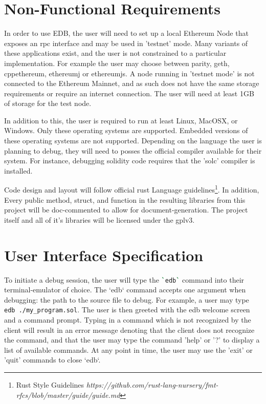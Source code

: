 \documentclass{report}
\begin{document}
\section{Non-Functional Requirements}
In order to use EDB, the user will need to set up a local Ethereum Node that exposes an \gls{rpc} interface and may be used in 'testnet' mode. Many variants of these applications exist, and the user is not constrained to a particular implementation. For example the user may choose between \Gls{parity}, \Gls{geth}, \Gls{cppethereum}, \Gls{ethereumj} or \Gls{ethereumjs}. A node running in 'testnet mode' is not connected to the Ethereum Mainnet, and as such does not have the same storage requirements or require an internet connection. The user will need at least 1GB of storage for the test node.

In addition to this, the user is required to run at least Linux, MacOSX, or Windows. Only these operating systems are supported. Embedded versions of these operating systems are not supported. Depending on the language the user is planning to debug, they will need to posses the official compiler available for their system. For instance, debugging \Gls{solidity} code requires that the 'solc' compiler is installed.

Code design and layout will follow official \Gls{rust} Language guidelines\footnote{Rust Style Guidelines \textit{https://github.com/rust-lang-nursery/fmt-rfcs/blob/master/guide/guide.md}}. In addition, Every public method, struct, and function in the resulting libraries from this project will be doc-commented to allow for document-generation. The project itself and all of it's libraries will be licensed under the \gls{gplv3}.


\section{User Interface Specification}

To initiate a debug session, the user will type the \lstinline[language=bash]{`edb`} command into their terminal-emulator of choice. The `edb` command accepts one argument when debugging: the path to the source file to debug. For example, a user may type \lstinline[language=bash]{edb ./my_program.sol}. The user is then greeted with the edb welcome screen and a command prompt. Typing in a command which is not recognized by the client will result in an error message denoting that the client does not recognize the command, and that the user may type the command 'help' or '?' to display a list of available commands. At any point in time, the user may use the 'exit' or 'quit' commands to close `edb`.
\end{document}
